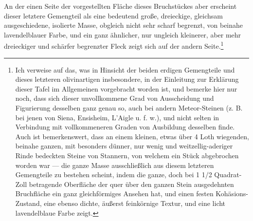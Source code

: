 \documentclass[a4paper, 11pt, oneside, german]{article}
\begin{document}
An der einen Seite der vorgestellten Fläche dieses Bruchstückes aber erscheint dieser letztere Gemengteil als eine bedeutend große, dreieckige, gleichsam ausgeschiedene, isolierte Masse, obgleich nicht sehr scharf begrenzt, von beinahe lavendelblauer Farbe, und ein ganz ähnlicher, nur ungleich kleinerer, aber mehr dreieckiger und schärfer begrenzter Fleck zeigt sich auf der andern Seite.\footnote{Ich verweise auf das, was in Hinsicht der beiden erdigen Gemengteile und dieses letzteren olivinartigen insbesondere, in der Einleitung zur Erklärung dieser Tafel im Allgemeinen vorgebracht worden ist, und bemerke hier nur noch, dass sich dieser unvollkommene Grad von Ausscheidung und Figurierung desselben ganz genau so, auch bei andern Meteor-Steinen (z. B. bei jenen von Siena, Ensisheim, L'Aigle u. f. w.), und nicht selten in Verbindung mit vollkommeneren Graden von Ausbildung desselben finde. Auch ist bemerkenswert, dass an einem kleinen, etwas über 4 Loth wiegenden, beinahe ganzen, mit besonders dünner, nur wenig und weitzellig-aderiger Rinde bedeckten Steine von Stannern, von welchem ein Stück abgebrochen worden war --- die ganze Masse ausschließlich aus diesem letzteren Gemengteile zu bestehen scheint, indem die ganze, doch bei 1 1/2 Quadrat-Zoll betragende Oberfläche der quer über den ganzen Stein ausgedehnten Bruchfläche ein ganz gleichförmiges Ansehen hat, und einen festen Kohäsions-Zustand, eine ebenso dichte, äußerst feinkörnige Textur, und eine licht lavendelblaue Farbe zeigt.}
\end{document}
